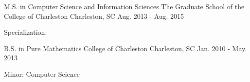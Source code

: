 

\begin{cventries}

  \cventry
    {M.S. in Computer Science and Information Sciences} %
    {The Graduate School of the College of Charleston} %
    {Charleston, SC} %
    {Aug. 2013 - Aug. 2015} %
    {
      \begin{cvitems} %
        \item {Specialization: }
      \end{cvitems}
    }

  \cventry
    {B.S. in Pure Mathematics} %
    {College of Charleston} %
    {Charleston, SC} %
    {Jan. 2010 - May. 2013} %
    {
      \begin{cvitems} %
        \item {Minor: Computer Science}
      \end{cvitems}
    }

\end{cventries}
